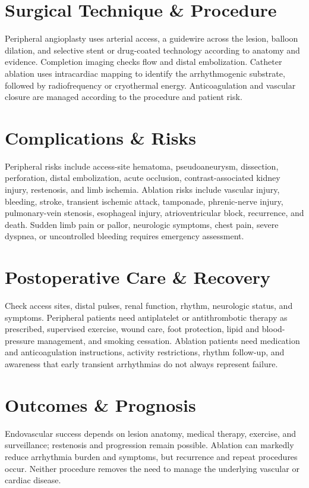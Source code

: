 \section*{Surgical Technique \& Procedure}
Peripheral angioplasty uses arterial access, a guidewire across the lesion, balloon dilation, and selective stent or drug-coated technology according to anatomy and evidence. Completion imaging checks flow and distal embolization. Catheter ablation uses intracardiac mapping to identify the arrhythmogenic substrate, followed by radiofrequency or cryothermal energy. Anticoagulation and vascular closure are managed according to the procedure and patient risk.

\section*{Complications \& Risks}
Peripheral risks include access-site hematoma, pseudoaneurysm, dissection, perforation, distal embolization, acute occlusion, contrast-associated kidney injury, restenosis, and limb ischemia. Ablation risks include vascular injury, bleeding, stroke, transient ischemic attack, tamponade, phrenic-nerve injury, pulmonary-vein stenosis, esophageal injury, atrioventricular block, recurrence, and death. Sudden limb pain or pallor, neurologic symptoms, chest pain, severe dyspnea, or uncontrolled bleeding requires emergency assessment.

\section*{Postoperative Care \& Recovery}
Check access sites, distal pulses, renal function, rhythm, neurologic status, and symptoms. Peripheral patients need antiplatelet or antithrombotic therapy as prescribed, supervised exercise, wound care, foot protection, lipid and blood-pressure management, and smoking cessation. Ablation patients need medication and anticoagulation instructions, activity restrictions, rhythm follow-up, and awareness that early transient arrhythmias do not always represent failure.

\section*{Outcomes \& Prognosis}
Endovascular success depends on lesion anatomy, medical therapy, exercise, and surveillance; restenosis and progression remain possible. Ablation can markedly reduce arrhythmia burden and symptoms, but recurrence and repeat procedures occur. Neither procedure removes the need to manage the underlying vascular or cardiac disease.

